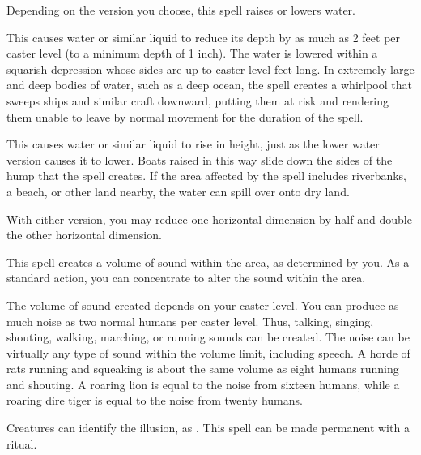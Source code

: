 \begin{spellheader}
    \spelldur{\durmed \dismissable}
\end{spellheader}
\begin{spelleffects}
    \spelleffect Depending on the version you choose, this spell raises or lowers water.
    \par {} This causes water or similar liquid to reduce its depth by as much as 2 feet per caster level (to a minimum depth of 1 inch). The water is lowered within a squarish depression whose sides are up to caster level  feet long. In extremely large and deep bodies of water, such as a deep ocean, the spell creates a whirlpool that sweeps ships and similar craft downward, putting them at risk and rendering them unable to leave by normal movement for the duration of the spell.
    \par {} This causes water or similar liquid to rise in height, just as the lower water version causes it to lower. Boats raised in this way slide down the sides of the hump that the spell creates. If the area affected by the spell includes riverbanks, a beach, or other land nearby, the water can spill over onto dry land.
\end{spelleffects}
\begin{spellfooter}
    \spellnotes With either version, you may reduce one horizontal dimension by half and double the other horizontal dimension.
\end{spellfooter}

\begin{spellheader}
    \spelldur{\durshort \dismissable}
\end{spellheader}
\begin{spelleffects}
    \spelleffect This spell creates a volume of sound within the area, as determined by you. As a standard action, you can concentrate to alter the sound within the area.
    \par The volume of sound created depends on your caster level. You can produce as much noise as two normal humans per caster level. Thus, talking, singing, shouting, walking, marching, or running sounds can be created. The noise can be virtually any type of sound within the volume limit, including speech. A horde of rats running and squeaking is about the same volume as eight humans running and shouting. A roaring lion is equal to the noise from sixteen humans, while a roaring dire tiger is equal to the noise from twenty humans.
\end{spelleffects}
\begin{spellfooter}
    \spellnotes Creatures can identify the illusion, as . This spell can be made permanent with a  ritual.
\end{spellfooter}


